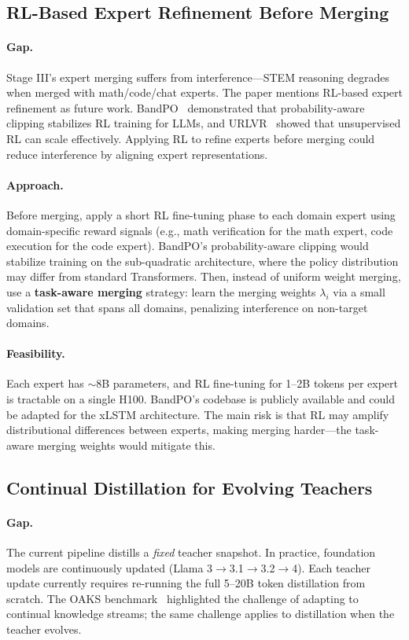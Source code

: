 \documentclass[11pt]{article}
\begin{document}
\subsection{RL-Based Expert Refinement Before Merging}

\paragraph{Gap.}
Stage III's expert merging suffers from interference---STEM reasoning degrades when merged with math/code/chat experts.
The paper mentions RL-based expert refinement as future work.
BandPO~\cite{bandpo} demonstrated that probability-aware clipping stabilizes RL training for LLMs, and URLVR~\cite{urlvr} showed that unsupervised RL can scale effectively.
Applying RL to refine experts before merging could reduce interference by aligning expert representations.

\paragraph{Approach.}
Before merging, apply a short RL fine-tuning phase to each domain expert using domain-specific reward signals (e.g., math verification for the math expert, code execution for the code expert).
BandPO's probability-aware clipping would stabilize training on the sub-quadratic architecture, where the policy distribution may differ from standard Transformers.
Then, instead of uniform weight merging, use a \textbf{task-aware merging} strategy: learn the merging weights $\lambda_i$ via a small validation set that spans all domains, penalizing interference on non-target domains.

\paragraph{Feasibility.}
Each expert has $\sim$8B parameters, and RL fine-tuning for 1--2B tokens per expert is tractable on a single H100.
BandPO's codebase is publicly available and could be adapted for the xLSTM architecture.
The main risk is that RL may amplify distributional differences between experts, making merging harder---the task-aware merging weights would mitigate this.

\subsection{Continual Distillation for Evolving Teachers}

\paragraph{Gap.}
The current pipeline distills a \emph{fixed} teacher snapshot.
In practice, foundation models are continuously updated (Llama 3$\rightarrow$3.1$\rightarrow$3.2$\rightarrow$4).
Each teacher update currently requires re-running the full 5--20B token distillation from scratch.
The OAKS benchmark~\cite{oaks} highlighted the challenge of adapting to continual knowledge streams; the same challenge applies to distillation when the teacher evolves.
\end{document}
